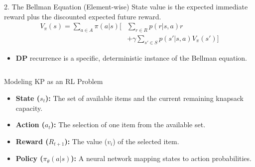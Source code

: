 \begin{frame}
\begin{columns}[T]
        \begin{column}{0.5\textwidth}
            \begin{block}{2. The Bellman Equation (Element-wise)}
                State value is the expected immediate reward plus the discounted expected future reward.
                \begin{align*}
                    V_{\pi}(s) = \sum_{a \in A} \pi(a|s) \bigg[ & \sum_{r \in R} p(r|s, a)r \\
                                                            & + \gamma \sum_{s' \in S} p(s'|s, a)V_{\pi}(s') \bigg]
                \end{align*}
                \begin{itemize}
                    \item \textbf{DP} recurrence is a specific, deterministic instance of the Bellman equation.
                \end{itemize}
            \end{block}
        \end{column}
    \end{columns}
    
    \begin{alertblock}{Modeling KP as an RL Problem}
        \begin{itemize}
            \item \textbf{State ($s_t$):} The set of available items and the current remaining knapsack capacity.
            \item \textbf{Action ($a_t$):} The selection of one item from the available set.
            \item \textbf{Reward ($R_{t+1}$):} The value ($v_i$) of the selected item.
            \item \textbf{Policy ($\pi_\theta(a|s)$):} A neural network mapping states to action probabilities.
        \end{itemize}
    \end{alertblock}

\end{frame}

